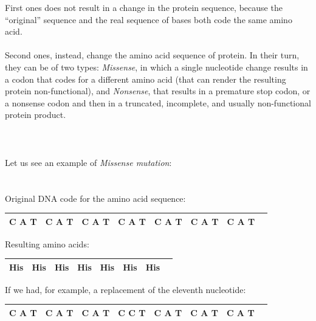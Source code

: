 First ones does not result in a change in the protein sequence, because the “original” sequence and the real sequence of bases both code the same amino acid.
\\
\\Second ones, instead, change the amino acid sequence of protein. In their turn, they can be of two types: \emph{Missense}, in which a single nucleotide change results in a codon that codes for a different amino acid (that can render the resulting protein non-functional), and \emph{Nonsense}, that results in a premature stop codon, or a nonsense codon and then in a truncated, incomplete, and usually non-functional protein product.
\\
\\
\\
\\Let us see an example of \emph{Missense mutation}:
\\
\\
\\Original DNA code for the amino acid sequence:

\vspace{5mm}

\begin{tabular}{|l|l|l|l|l|l|rl|}
\hline
C   A   T         &	C   A   T         &	C   A   T         &	C   A   T         &	C   A   T         &	C   A   T         &	C   A   T  	&       \\
\hline
\end{tabular}

\vspace{15mm}

Resulting amino acids:

\vspace{5mm}

\begin{tabular}{|l|l|l|l|l|l|rl|}
\hline
His         &	His         &	His         &	His         &	His         &	His         &	His  	&       \\
\hline
\end{tabular}

\vspace{25mm}

If we had, for example, a replacement of the eleventh nucleotide:

\vspace{5mm}

\begin{tabular}{|l|l|l|l|l|l|rl|}
\hline
C   A   T         &	C   A   T         &	C   A   T         &	C   \textbf{C}   T         &	C   A   T         &	C   A   T         &	C   A   T  	&       \\
\hline
\end{tabular}

